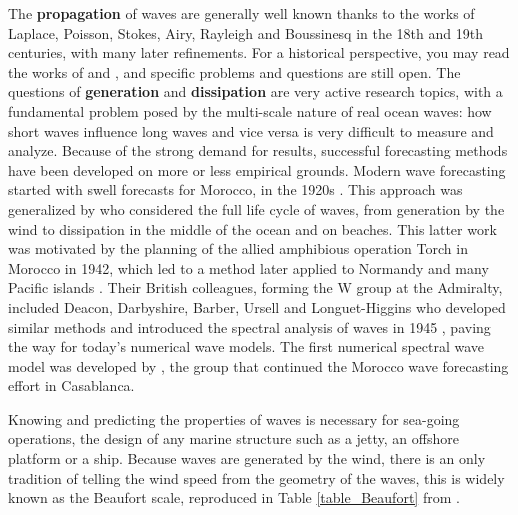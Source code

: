 The \textbf{propagation} of waves are generally well known thanks to the works of Laplace, Poisson, Stokes, Airy, Rayleigh and Boussinesq in 
the 18th and 19th centuries, with many later refinements. For a historical perspective, you may read the works of  \cite{Darrigol2003} and \cite{Craik2004}, and specific problems and questions are still open. The questions of  \textbf{generation} and \textbf{dissipation} are very active
research topics, with a fundamental problem posed by the multi-scale nature of real ocean waves: how short waves influence long waves and vice versa is 
very difficult to measure and analyze. Because of the strong demand for results, successful forecasting methods have been developed on more or less empirical grounds. 
Modern wave forecasting started with swell forecasts
for Morocco, in the 1920s \citep{Gain1918,Montagne1922}. This approach was generalized by 
\cite{Sverdrup&Munk1947} who considered the full life cycle of waves, from generation by the wind to dissipation 
in the middle of the ocean and on beaches. This latter work was 
motivated by the planning of the allied amphibious operation Torch in Morocco in 1942, which led to a method later applied to Normandy 
and many Pacific islands \citep{Bates1949}. Their British colleagues, forming the W group at the Admiralty, included Deacon, Darbyshire, Barber, Ursell and Longuet-Higgins  
who developed similar methods and introduced the spectral analysis of waves in 1945 \citep{Ursell1999}, paving the way for 
today's numerical wave models. The first numerical spectral wave model was developed by \cite{Gelci&al.1957}, the group that continued the Morocco wave forecasting effort in Casablanca.


Knowing and predicting the properties of waves is necessary for sea-going operations, the design of any marine structure such as 
a jetty, an offshore platform or a ship. Because waves are generated by the wind, there is an only tradition of telling the wind speed from the geometry of the waves, this is widely known as the Beaufort scale, reproduced in Table \ref{table_Beaufort} from \cite{Alcock&Morgan1978}. 

